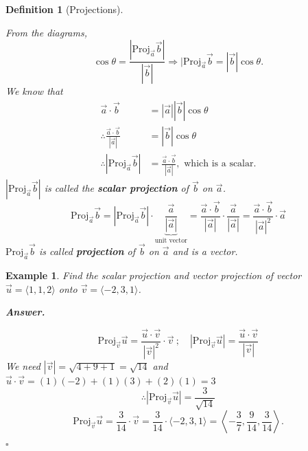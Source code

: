\documentclass[12pt,a4paper]{article}
\newtheorem{df}{Definition}[subsection]
\newtheorem{eg}{Example}[subsection]
\newenvironment*{ans}{\par\indent\textbf{\textit{Answer. }}\par}{\par\hfill{$\square$}\par}
\def\Proj{\mathrm{Proj}}
\def\vecv{\vec{v}}
\def\vecu{\vec{u}}
\def\veca{\vec{a}}
\def\vecb{\vec{b}}
\begin{document}
\begin{df}[Projections]
\begin{center}
	\end{center}
	From the diagrams, \[\cos\theta=\frac{|\Proj_{\veca}\vecb|}{|\vecb|}\Longrightarrow|\Proj_{\veca}\vecb=\boxed{|\vecb|\cos\theta}.\]
	We know that \[\begin{aligned}
		\veca\cdot\vecb&=|\veca||\vecb|\cos\theta\\
		\therefore\frac{\veca\cdot\vecb}{|\veca|}&=\boxed{|\vecb|\cos\theta}\\
		\therefore |\Proj_{\veca}\vecb|&=\frac{\veca\cdot\vecb}{|\veca|},\text{ which is a scalar.}
	\end{aligned}\]
	$|\Proj_{\veca}\vecb|$ is called the \textbf{scalar projection} of $\vecb$ on $\veca$.
	\[\Proj_{\veca}\vecb=|\Proj_{\veca}\vecb|\cdot\underbrace{\frac{\veca}{|\veca|}}_{\text{unit vector}}=\frac{\veca\cdot\vecb}{|\veca|}\cdot\frac{\veca}{|\veca|}=\frac{\veca\cdot\vecb}{|\veca|^2}\cdot\veca\]
	$\Proj_{\veca}\vecb$ is called \textbf{projection} of $\vecb$ on $\veca$ and is a vector. 
\end{df}
\begin{eg}
	Find the scalar projection and vector projection of vector $\vecu=\langle1,1,2\rangle$ onto $\vecv=\langle-2,3,1\rangle$.
	\begin{ans}
		\[\Proj_{\vecv}\vecu=\frac{\vecu\cdot\vecv}{|\vecv|^2}\cdot\vecv\ ;\quad |\Proj_{\vecv}\vecu|=\frac{\vecu\cdot\vecv}{|\vecv|}\]
		We need $|\vecv|=\sqrt{4+9+1}=\sqrt{14}$ and $\vecu\cdot\vecv=(1)(-2)+(1)(3)+(2)(1)=3$
		\[\therefore |\Proj_{\vecv}\vecu|=\frac{3}{\sqrt{14}}\]
		\[\Proj_{\vecv}\vecu=\frac{3}{14}\cdot\vecv=\frac{3}{14}\cdot\langle-2,3,1\rangle=\left\langle-\frac{3}{7},\frac{9}{14},\frac{3}{14}\right\rangle.\]
	\end{ans}
\end{eg}
\end{document}
